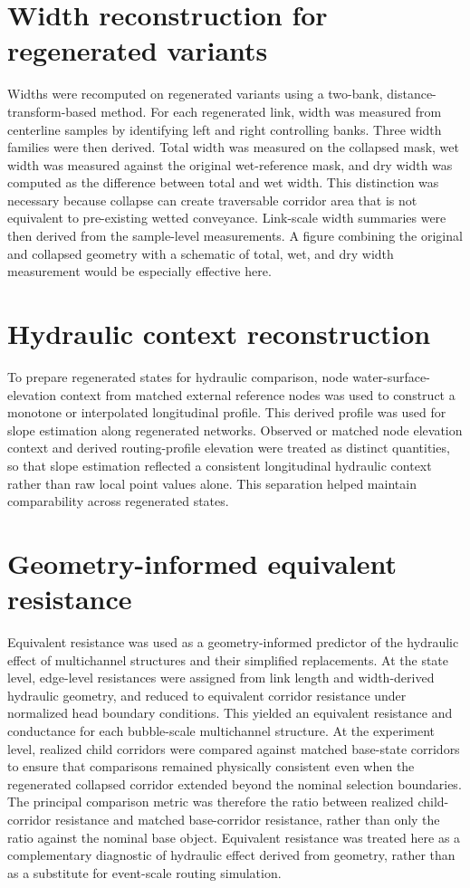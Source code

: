 \documentclass[11pt]{article}
\begin{document}
\section{Width reconstruction for regenerated variants}
Widths were recomputed on regenerated variants using a two-bank, distance-transform-based method. For each regenerated link, width was measured from centerline samples by identifying left and right controlling banks. Three width families were then derived. Total width was measured on the collapsed mask, wet width was measured against the original wet-reference mask, and dry width was computed as the difference between total and wet width. This distinction was necessary because collapse can create traversable corridor area that is not equivalent to pre-existing wetted conveyance. Link-scale width summaries were then derived from the sample-level measurements. A figure combining the original and collapsed geometry with a schematic of total, wet, and dry width measurement would be especially effective here.

\section{Hydraulic context reconstruction}
To prepare regenerated states for hydraulic comparison, node water-surface-elevation context from matched external reference nodes was used to construct a monotone or interpolated longitudinal profile. This derived profile was used for slope estimation along regenerated networks. Observed or matched node elevation context and derived routing-profile elevation were treated as distinct quantities, so that slope estimation reflected a consistent longitudinal hydraulic context rather than raw local point values alone. This separation helped maintain comparability across regenerated states.

\section{Geometry-informed equivalent resistance}
Equivalent resistance was used as a geometry-informed predictor of the hydraulic effect of multichannel structures and their simplified replacements. At the state level, edge-level resistances were assigned from link length and width-derived hydraulic geometry, and reduced to equivalent corridor resistance under normalized head boundary conditions. This yielded an equivalent resistance and conductance for each bubble-scale multichannel structure. At the experiment level, realized child corridors were compared against matched base-state corridors to ensure that comparisons remained physically consistent even when the regenerated collapsed corridor extended beyond the nominal selection boundaries. The principal comparison metric was therefore the ratio between realized child-corridor resistance and matched base-corridor resistance, rather than only the ratio against the nominal base object. Equivalent resistance was treated here as a complementary diagnostic of hydraulic effect derived from geometry, rather than as a substitute for event-scale routing simulation.
\end{document}
